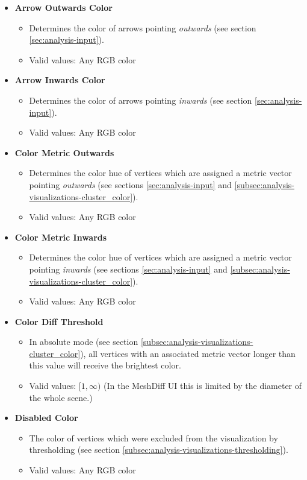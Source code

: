 \begin{itemize}
\item {\bf Arrow Outwards Color}
	\begin{itemize}
		\item Determines the color of arrows pointing {\it outwards} (see section \ref{sec:analysis-input}).
		\item Valid values: Any RGB color
	\end{itemize}

\item {\bf Arrow Inwards Color} 
	\begin{itemize}
		\item Determines the color of arrows pointing {\it inwards} (see section \ref{sec:analysis-input}).
		\item Valid values: Any RGB color
	\end{itemize}

\item {\bf Color Metric Outwards}
	\begin{itemize}
		\item Determines the color hue of vertices which are assigned a metric vector pointing {\it outwards} (see sections \ref{sec:analysis-input} and \ref{subsec:analysis-visualizations-cluster_color}).
		\item Valid values: Any RGB color
	\end{itemize}

\item {\bf Color Metric Inwards}
	\begin{itemize}
		\item Determines the color hue of vertices which are assigned a metric vector pointing {\it inwards} (see sections \ref{sec:analysis-input} and \ref{subsec:analysis-visualizations-cluster_color}).
		\item Valid values: Any RGB color
	\end{itemize}

\item {\bf Color Diff Threshold}
	\begin{itemize}
		\item In absolute mode (see section \ref{subsec:analysis-visualizations-cluster_color}), all vertices with an associated metric vector longer than this value will receive the brightest color.
		\item Valid values: \([1, \infty)\) (In the MeshDiff UI this is limited by the diameter of the whole scene.)
	\end{itemize}

\item {\bf Disabled Color}
	\begin{itemize}
		\item The color of vertices which were excluded from the visualization by thresholding (see section \ref{subsec:analysis-visualizations-thresholding}).
		\item Valid values: Any RGB color
	\end{itemize}


\end{itemize}
